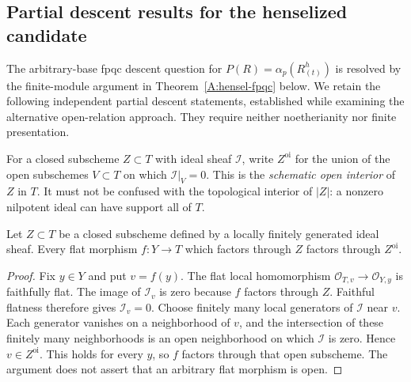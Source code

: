 \subsection{Partial descent results for the henselized candidate}

The arbitrary-base fpqc descent question for
$P(R)=\alpha_p(R^h_{(t)})$ is resolved by the finite-module argument
in Theorem~\ref{A:hensel-fpqc} below.  We retain the following
independent partial descent statements, established while examining
the alternative open-relation approach.  They require neither
noetherianity nor finite presentation.

For a closed subscheme $Z\subset T$ with ideal sheaf $\mathcal I$, write
$Z^{\mathrm{oi}}$ for the union of the open subschemes $V\subset T$
on which $\mathcal I|_V=0$.  This is the \emph{schematic open interior}
of $Z$ in $T$.  It must not be confused with the topological interior
of $|Z|$: a nonzero nilpotent ideal can have support all of $T$.

\begin{lemma}
\label{A:fpqc-schematic-interior}
Let $Z\subset T$ be a closed subscheme defined by a locally finitely
generated ideal sheaf.  Every flat morphism $f:Y\to T$ which factors
through $Z$ factors through $Z^{\mathrm{oi}}$.
\end{lemma}
\begin{proof}
Fix $y\in Y$ and put $v=f(y)$.  The flat local homomorphism
$\mathcal O_{T,v}\to\mathcal O_{Y,y}$ is faithfully flat.
The image of $\mathcal I_v$ is zero because $f$ factors through $Z$.
Faithful flatness therefore gives $\mathcal I_v=0$.
Choose finitely many local generators of $\mathcal I$ near $v$.
Each generator vanishes on a neighborhood of $v$, and the intersection
of these finitely many neighborhoods is an open neighborhood on which
$\mathcal I$ is zero.  Hence $v\in Z^{\mathrm{oi}}$.
This holds for every $y$, so $f$ factors through that open subscheme.
The argument does not assert that an arbitrary flat morphism is open.
\end{proof}

